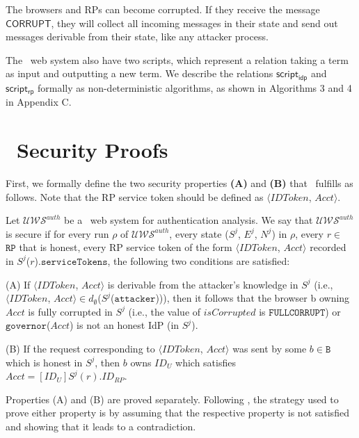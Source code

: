 The browsers and RPs can become corrupted. If they receive the message $\mathsf{CORRUPT}$, they will collect all incoming messages in their state and send out messages derivable from their state, like any attacker process.

The \usso\ web system also have two scripts, which represent a relation taking a term as input and
outputting a new term. We describe the relations $\mathsf{script_{idp}}$ and $\mathsf{script_{rp}}$ formally as non-deterministic algorithms, as shown in Algorithms 3 and 4 in Appendix C.

\section{\usso\ Security Proofs}
\label{appendix-security}

First, we formally define the two security properties {\bf (A)} and {\bf (B)} that \usso\ fulfills as follows. Note that the RP service token should be defined as $\langle IDToken$, $Acct \rangle$.

\begin{definition}
Let  $\mathcal{U\!W\!S}^{auth}$ be a \usso\ web system for authentication analysis. We say that $\mathcal{U\!W\!S}^{auth}$ is secure if for every run $\rho$ of $\mathcal{U\!W\!S}^{auth}$, every state ($S^j$, $E^j$, $N^j$) in $\rho$, every $r \in$ $\mathtt{RP}$ that is honest, every RP service token of the form $\langle IDToken$, $Acct \rangle$ recorded in $S^j$($r$).$\mathtt{serviceTokens}$, the following two conditions are satisfied:

(A) If $\langle IDToken$, $Acct \rangle$ is derivable from the attacker's knowledge in $S^j$ (i.e., $\langle IDToken$, $Acct \rangle \in d_{\emptyset}$($S^j$($\mathtt{attacker}$))), then it follows that the browser b owning $Acct$ is fully corrupted in $S^j$ (i.e., the value of $isCorrupted$ is $\mathtt{FULLCORRUPT}$) or $\mathtt{governor}$($Acct$) is not an honest IdP (in $S^j$).

(B) If the request corresponding to $\langle IDToken$, $Acct \rangle$ was sent by some $b \in \mathtt{B}$ which is honest in $S^j$, then $b$ owns $ID_U$ which satisfies $Acct=[ID_U]S^j(r).ID_{RP}$.
\end{definition}

Properties (A) and (B) are proved separately. Following \cite{SPRESSO}, the strategy used to prove either property is by assuming that the respective property is not satisfied and showing that it leads to a contradiction.

